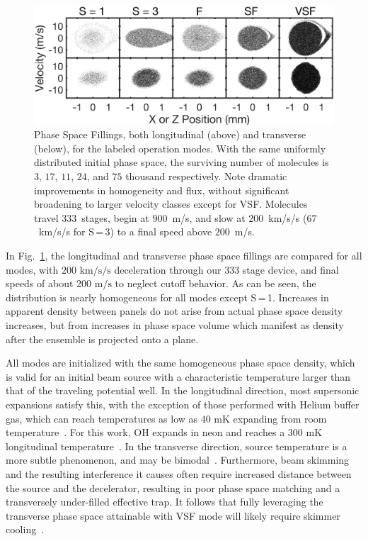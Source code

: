 \documentclass[%
 reprint,
 amsmath,amssymb,
 aps,
prl,
]{revtex4-1}
\begin{document}
\begin{figure}[t]
\includegraphics[width=\linewidth]{5x2-PSD-Compare.png}
\vspace{-15pt}
\caption{\label{fig:phasespace}
Phase Space Fillings, both longitudinal (above) and transverse (below), for the labeled operation modes. 
With the same uniformly distributed initial phase space, the surviving number of molecules is $3$, $17$, $11$, $24$, and $75$ thousand respectively.
Note dramatic improvements in homogeneity and flux, without significant broadening to larger velocity classes except for VSF. 
Molecules travel $333$~stages, begin at $900$~m/s, and slow at $200$~km/s/s ($67$~km/s/s for S\,=\,3) to a final speed above $200$~m/s.
}
\end{figure}

In Fig.~\ref{fig:phasespace}, the longitudinal and transverse phase space fillings are compared for all modes, with $200\text{ km/s/s}$ deceleration through our $333$ stage device, and final speeds of about $200\text{ m/s}$ to neglect cutoff behavior. 
As can be seen, the distribution is nearly homogeneous for all modes except S\,=\,1.
Increases in apparent density between panels do not arise from actual phase space density increases, but from increases in phase space volume which manifest as density after the ensemble is projected onto a plane.

All modes are initialized with the same homogeneous phase space density, which is valid for an initial beam source with a characteristic temperature larger than that of the traveling potential well.
In the longitudinal direction, most supersonic expansions satisfy this, with the exception of those performed with Helium buffer gas, which can reach temperatures as low as $40\text{ mK}$ expanding from room temperature~\cite{Even2014}.
For this work, OH expands in neon and reaches a $300\text{ mK}$ longitudinal temperature~\cite{Wu2018}.
In the transverse direction, source temperature is a more subtle phenomenon, and may be bimodal~\cite{Beijerinck1981}.
Furthermore, beam skimming and the resulting interference it causes often require increased distance between the source and the decelerator, resulting in poor phase space matching and a transversely under-filled effective trap.
It follows that fully leveraging the transverse phase space attainable with VSF mode will likely require skimmer cooling~\cite{Wu2018}.
\end{document}
